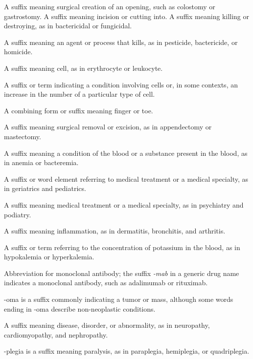 
 A suffix meaning surgical creation of an opening, such as colostomy or gastrostomy.
 A suffix meaning incision or cutting into.
 A suffix meaning killing or destroying, as in bactericidal or fungicidal.

 A suffix meaning an agent or process that kills, as in pesticide, bactericide, or homicide.

 A suffix meaning cell, as in erythrocyte or leukocyte.

 A suffix or term indicating a condition involving cells or, in some contexts, an increase in the number of a particular type of cell.

 A combining form or suffix meaning finger or toe.

 A suffix meaning surgical removal or excision, as in appendectomy or mastectomy.

 A suffix meaning a condition of the blood or a substance present in the blood, as in anemia or bacteremia.

 A suffix or word element referring to medical treatment or a medical specialty, as in geriatrics and pediatrics.

 A suffix meaning medical treatment or a medical specialty, as in psychiatry and podiatry.

 A suffix meaning inflammation, as in dermatitis, bronchitis, and arthritis.

 A suffix or term referring to the concentration of potassium in the blood, as in hypokalemia or hyperkalemia.

 Abbreviation for monoclonal antibody; the suffix \textit{-mab} in a generic drug name indicates a monoclonal antibody, such as adalimumab or rituximab.

 -oma is a suffix commonly indicating a tumor or mass, although some words ending in -oma describe non-neoplastic conditions.

 A suffix meaning disease, disorder, or abnormality, as in neuropathy, cardiomyopathy, and nephropathy.

 -plegia is a suffix meaning paralysis, as in paraplegia, hemiplegia, or quadriplegia.

